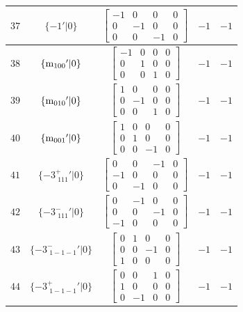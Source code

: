 \documentclass[fleqn,8pt]{jsarticle}
\begin{document}
\begin{longtable}{ccccc}
$ 37 $ & $ \{-1{}'|0\} $ & $ \begin{bmatrix} -1 & 0 & 0 & 0 \\ 0 & -1 & 0 & 0 \\ 0 & 0 & -1 & 0 \end{bmatrix} $ & $ -1 $ & $ -1 $ \\ \hline
$ 38 $ & $ \{{\rm m}_{100}{}'|0\} $ & $ \begin{bmatrix} -1 & 0 & 0 & 0 \\ 0 & 1 & 0 & 0 \\ 0 & 0 & 1 & 0 \end{bmatrix} $ & $ -1 $ & $ -1 $ \\ \hline
$ 39 $ & $ \{{\rm m}_{010}{}'|0\} $ & $ \begin{bmatrix} 1 & 0 & 0 & 0 \\ 0 & -1 & 0 & 0 \\ 0 & 0 & 1 & 0 \end{bmatrix} $ & $ -1 $ & $ -1 $ \\ \hline
$ 40 $ & $ \{{\rm m}_{001}{}'|0\} $ & $ \begin{bmatrix} 1 & 0 & 0 & 0 \\ 0 & 1 & 0 & 0 \\ 0 & 0 & -1 & 0 \end{bmatrix} $ & $ -1 $ & $ -1 $ \\ \hline
$ 41 $ & $ \{-3^{+}_{\,\,111}{}'|0\} $ & $ \begin{bmatrix} 0 & 0 & -1 & 0 \\ -1 & 0 & 0 & 0 \\ 0 & -1 & 0 & 0 \end{bmatrix} $ & $ -1 $ & $ -1 $ \\ \hline
$ 42 $ & $ \{-3^{-}_{\,\,111}{}'|0\} $ & $ \begin{bmatrix} 0 & -1 & 0 & 0 \\ 0 & 0 & -1 & 0 \\ -1 & 0 & 0 & 0 \end{bmatrix} $ & $ -1 $ & $ -1 $ \\ \hline
$ 43 $ & $ \{-3^{-}_{\,\,1-1-1}{}'|0\} $ & $ \begin{bmatrix} 0 & 1 & 0 & 0 \\ 0 & 0 & -1 & 0 \\ 1 & 0 & 0 & 0 \end{bmatrix} $ & $ -1 $ & $ -1 $ \\ \hline
$ 44 $ & $ \{-3^{+}_{\,\,1-1-1}{}'|0\} $ & $ \begin{bmatrix} 0 & 0 & 1 & 0 \\ 1 & 0 & 0 & 0 \\ 0 & -1 & 0 & 0 \end{bmatrix} $ & $ -1 $ & $ -1 $ \\ \hline

\end{longtable}
\end{document}
